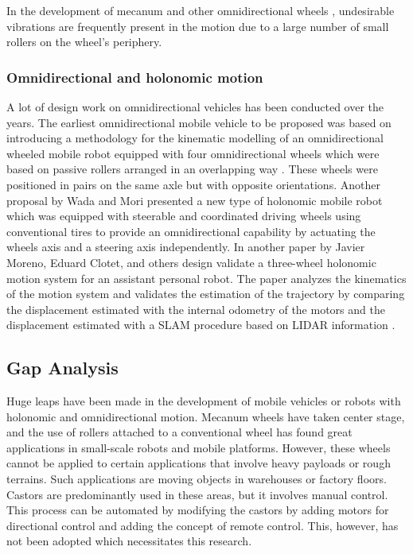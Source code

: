 In the development of mecanum and other omnidirectional wheels \cite{kim_design_2001}\cite{paromtchik_practical_1994}, undesirable vibrations are frequently present in the motion due to a large number of small rollers on the wheel's periphery.

\subsubsection{Omnidirectional and holonomic motion}

A lot of design work on omnidirectional vehicles has been conducted over the years.
The earliest omnidirectional mobile vehicle to be proposed was based on introducing a methodology for the kinematic modelling of an omnidirectional wheeled mobile robot equipped with four omnidirectional wheels which were based on passive rollers arranged
in an overlapping way \cite{javier_moreno_design_2016}.
These wheels were positioned in pairs on the same axle but with opposite orientations.
Another proposal by Wada and Mori \cite{wada_holonomic_1996} presented a new type of holonomic mobile robot which was equipped with steerable and coordinated driving wheels using conventional tires to provide an omnidirectional capability by actuating the wheels axis and a steering axis independently.
In another paper by Javier Moreno, Eduard Clotet, and others design \cite{javier_moreno_design_2016} validate a three-wheel holonomic motion system for an assistant personal robot.
The paper analyzes the kinematics of the motion system and validates the estimation of the trajectory by comparing the displacement estimated with the internal odometry of the motors and the displacement estimated with a \ac{SLAM} procedure based on \ac{LIDAR} information . 

\subsection{Gap Analysis}

Huge leaps have been made in the development of mobile vehicles or robots with holonomic and omnidirectional motion.
Mecanum wheels have taken center stage, and the use of rollers attached to a conventional wheel has found great applications in small-scale robots and mobile platforms.
However, these wheels cannot be applied to certain applications that involve heavy payloads or rough terrains.
Such applications are moving objects in warehouses or factory floors.
Castors are predominantly used in these areas, but it involves manual control.
This process can be automated by modifying the castors by adding motors for directional control and adding the concept of remote control.
This, however, has not been adopted which necessitates this research.



